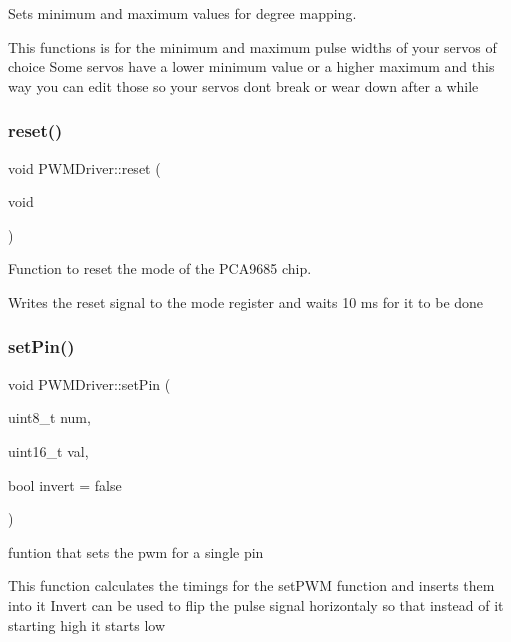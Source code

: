 Sets minimum and maximum values for degree mapping. 

This functions is for the minimum and maximum pulse widths of your servos of choice Some servos have a lower minimum value or a higher maximum and this way you can edit those so your servos dont break or wear down after a while \mbox{\label{classPWMDriver_a3df1a36b697cb9297676a30d1ebeecd3}} 
\subsubsection{\texorpdfstring{reset()}{reset()}}
{\footnotesize\ttfamily void P\+W\+M\+Driver\+::reset (\begin{DoxyParamCaption}\item[{void}]{ }\end{DoxyParamCaption})}



Function to reset the mode of the P\+C\+A9685 chip. 

Writes the reset signal to the mode register and waits 10 ms for it to be done \mbox{\label{classPWMDriver_a2046fc4de1b6000aa02d3fb4eae8a3e9}} 
\subsubsection{\texorpdfstring{set\+Pin()}{setPin()}}
{\footnotesize\ttfamily void P\+W\+M\+Driver\+::set\+Pin (\begin{DoxyParamCaption}\item[{uint8\+\_\+t}]{num,  }\item[{uint16\+\_\+t}]{val,  }\item[{bool}]{invert = {\ttfamily false} }\end{DoxyParamCaption})}



funtion that sets the pwm for a single pin 

This function calculates the timings for the set\+P\+WM function and inserts them into it Invert can be used to flip the pulse signal horizontaly so that instead of it starting high it starts low \mbox{\label{classPWMDriver_a5c94a2f5ea34ba2cd3af6b589b82590c}} 

